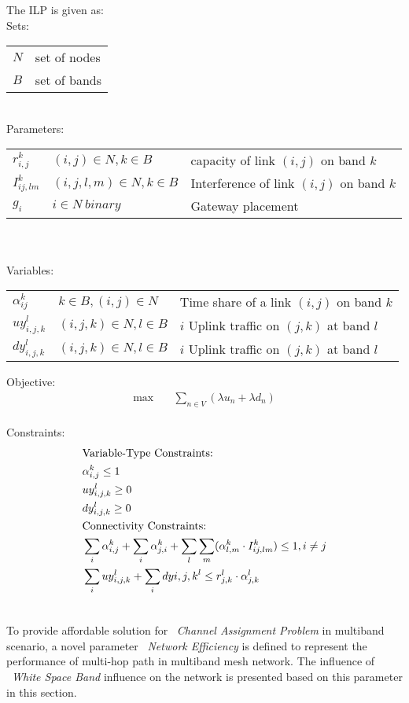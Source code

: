 \vspace{0.05in}
The ILP is given as:
\\
Sets:\\
\begin{tabular}{ll}
$N$ & set of nodes \\
$B$ & set of bands \\
\end{tabular} 
\\
Parameters: \\
\begin{tabular}{lll}
$r_{i,j}^k$ & $(i,j) \in N, k \in B$ & capacity of link $(i,j)$ on band $k$ \\
$I_{ij,lm}^k$ & $(i,j,l,m) \in N, k \in B $ & Interference of link $(i,j)$ on band $k$\\
$g_i$ & $i \in N\ binary$ & Gateway placement
\end{tabular}\\
\\
Variables:\\
\begin{tabular}{lll}
$\alpha_{ij}^k$ & $k\in B, (i,j) \in N$ & Time share of a link $(i,j)$ on band $k$\\ 
$uy_{i,j,k}^l$ & $(i,j,k) \in N, l \in B$ & $i$ Uplink traffic on $(j,k)$ at band $l$ \\ 
$dy_{i,j,k}^l$ & $(i,j,k) \in N, l \in B$ & $i$ Uplink traffic on $(j,k)$ at band $l$ \\ 
\end{tabular}
Objective:
\begin{align}
\max \quad
& \sum_{n \in V}(\lambda u_n+ \lambda d_n)
\end{align}\\
Constraints:
\begin{align}
& \text{Variable-Type Constraints:}\notag \\
& \alpha _{i,j}^k \leq 1 \\
& uy_{i,j,k}^l \geq 0 \\
& dy_{i,j,k}^l \geq 0 \\
& \text{Connectivity Constraints:} \notag \\
& \sum_i \alpha_{i,j}^k + \sum_i \alpha_{j,i}^k + \sum_l\sum_m(\alpha_{l,m}^k \cdot I_{ij,lm}^k) \leq 1, i\neq j \\
& \sum_i uy_{i,j,k}^l + \sum_i dy{i,j,k}^l \leq r_{j,k}^l \cdot \alpha_{j,k}^l \\
& \end{align}
 
                                        
To provide affordable solution for ~\emph{Channel Assignment Problem} in multiband scenario, a novel parameter ~\emph{Network Efficiency} is defined to represent the performance of multi-hop path in multiband mesh network.
The influence of ~\emph{White Space Band} influence on the network is presented based on this parameter in this section.

